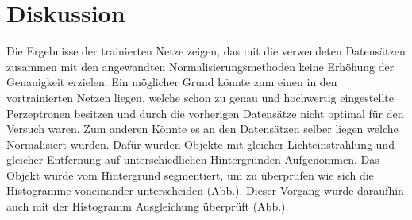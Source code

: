 \documentclass[a4paper,12pt,oneside]{article}
\begin{document}
  \section{Diskussion}
Die Ergebnisse der trainierten Netze zeigen, das mit die verwendeten Datensätzen zusammen mit den angewandten Normalisierungsmethoden keine Erhöhung der Genauigkeit erzielen. Ein möglicher Grund könnte zum einen in den vortrainierten Netzen liegen, welche schon zu genau und hochwertig eingestellte Perzeptronen besitzen und durch die vorherigen Datensätze nicht optimal für den Versuch waren. Zum anderen Könnte es an den Datensätzen selber liegen welche Normalisiert wurden. Dafür wurden Objekte mit gleicher Lichteinstrahlung und gleicher Entfernung auf unterschiedlichen Hintergründen Aufgenommen. Das Objekt wurde vom Hintergrund segmentiert, um zu überprüfen wie sich die Histogramme voneinander unterscheiden (Abb.). Dieser Vorgang wurde daraufhin auch mit der Histogramm Ausgleichung überprüft (Abb.).\\
\end{document}
